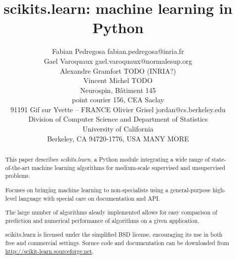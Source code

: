 \documentclass[twoside,11pt]{article}
\begin{document}
\title{scikits.learn: machine learning in Python}


\author{\name Fabian Pedregosa \email fabian.pedregosa@inria.fr \\
        \name Gael Varoquaux \email gael.varoquaux@normalesup.org  \\
        \name Alexandre Gramfort \email TODO (INRIA?)\\
        \name Vincent Michel  \email TODO \\
       \addr  Neurospin, Bâtiment 145\\
       point courier 156, CEA Saclay\\
       91191 Gif sur Yvette – FRANCE
       \AND
       \name Olivier Grisel \email jordan@cs.berkeley.edu \\
       \addr Division of Computer Science and Department of Statistics\\
       University of California\\
       Berkeley, CA 94720-1776, USA
       \AND
       \name MANY MORE
}





\maketitle

\begin{abstract}
This paper describes \emph{scikits.learn}, a Python module integrating
a wide range of state-of-the-art machine learning algorithms for
medium-scale supervised and unsupervised problems.


Focuses on bringing machine learning to non-specialists using a
general-purpose high-level language with special care on
documentation and API.

The large number of algorithms aleady implemented allows for easy
comparison of prediction and numerical performance of algorithms on a
given application.


scikits.learn is licensed under the simplified BSD license,
encouraging its use in both free and commercial settings. Soruce code
and documentation can be downloaded from
\url{http://scikit-learn.sourceforge.net}.

\end{abstract}

\end{document}
